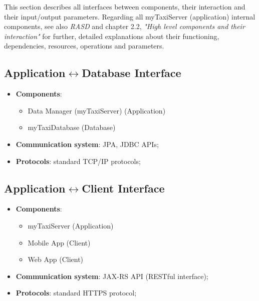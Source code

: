 This section describes all interfaces between components, their interaction and their input/output parameters. Regarding all myTaxiServer (application) internal components, see also \textit{RASD} and chapter 2.2, \textit{"High level components and their interaction"} for further, detailed explanations about their functioning, dependencies, resources, operations and parameters.

\subsection{Application$\leftrightarrow$Database Interface}
	\begin{itemize}
		\item [] \textbf{Components}:
			\begin{itemize}
				\item Data Manager (myTaxiServer) (Application)
				\item myTaxiDatabase (Database)
			\end{itemize}			
		\item [] \textbf{Communication system}: JPA, JDBC APIs;
		\item [] \textbf{Protocols}: standard TCP/IP protocols;
	\end{itemize}
	
\subsection{Application$\leftrightarrow$Client Interface}
	\begin{itemize}
		\item [] \textbf{Components}:
		\begin{itemize}
			\item myTaxiServer (Application)
			\item Mobile App (Client)
			\item Web App (Client)
		\end{itemize}			
		\item [] \textbf{Communication system}: JAX-RS API (RESTful interface);
		\item [] \textbf{Protocols}: standard HTTPS protocol;
	\end{itemize}
	
